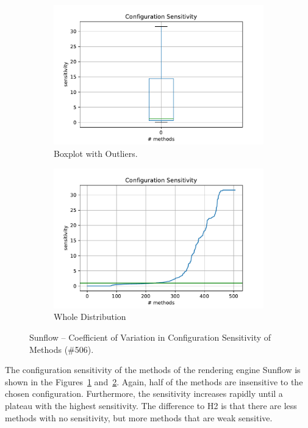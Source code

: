\begin{figure}[h]
	\centering
	\begin{subfigure}{.5\textwidth}
	  \centering
	  \includegraphics[width=.99\linewidth]{images/Sunflow_box_conf_sens_cv_with_outl}
	  \caption{Boxplot with Outliers.}
	  \label{fig:s_conf_sens_on_method:sub1}
	\end{subfigure}%
	\begin{subfigure}{.5\textwidth}
	  \centering
	  \includegraphics[width=.99\linewidth]{images/Sunflow_plt_conf_sens_cv_with_outl}
	  \caption{Whole Distribution}
	  \label{fig:s_conf_sens_on_method:sub2}
	\end{subfigure}
	\caption{Sunflow -- Coefficient of Variation in Configuration Sensitivity of Methods (\#506).}
	\label{fig:s_conf_sens_on_method}
\end{figure}

The configuration sensitivity of the methods of the rendering engine Sunflow is shown in the Figures~\ref{fig:s_conf_sens_on_method:sub1} and~\ref{fig:s_conf_sens_on_method:sub2}. Again, half of the methods are insensitive to the chosen configuration. Furthermore, the sensitivity increases rapidly until a plateau with the highest sensitivity. The difference to H2 is that there are less methods with no sensitivity, but more methods that are weak sensitive.



